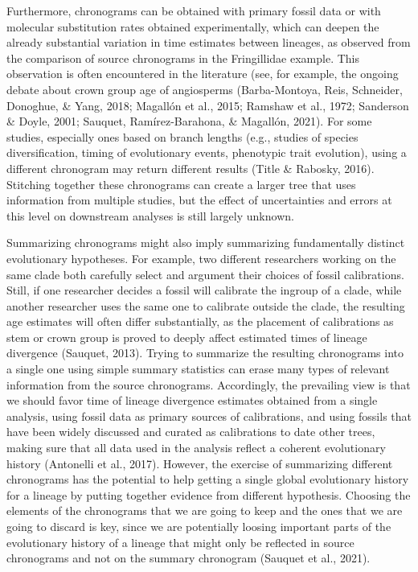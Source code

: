 \documentclass[
  english,
  man]{apa6}
\begin{document}
Furthermore, chronograms can be obtained with primary fossil data or with molecular substitution rates obtained experimentally, which can deepen the already substantial variation in time estimates between lineages, as observed from the comparison of source chronograms in the Fringillidae example.
This observation is often encountered in the literature
(see, for example, the ongoing debate about crown group age of angiosperms (Barba-Montoya, Reis, Schneider, Donoghue, \& Yang, 2018; Magallón et al., 2015; Ramshaw et al., 1972; Sanderson \& Doyle, 2001; Sauquet, Ramírez-Barahona, \& Magallón, 2021). For some studies, especially ones based on branch lengths (e.g., studies of species diversification, timing of evolutionary events, phenotypic trait evolution), using a different chronogram may return different results (Title \& Rabosky, 2016). Stitching together these chronograms can create a larger tree that uses information from multiple studies, but the effect of uncertainties and errors at this level on downstream analyses is still largely unknown.

Summarizing chronograms might also imply summarizing fundamentally distinct evolutionary hypotheses.
For example, two different researchers working on the same clade both carefully select and argument their choices of fossil calibrations.
Still, if one researcher decides a fossil will calibrate the ingroup of a clade, while another researcher uses the same one to calibrate outside the clade, the resulting age estimates will often differ substantially, as the placement of calibrations as stem or crown group is proved to deeply affect estimated times of lineage divergence (Sauquet, 2013). Trying to summarize the resulting chronograms into a single one using simple summary statistics can erase many types of relevant information from the source chronograms. Accordingly, the prevailing view is that we should favor time of lineage divergence estimates obtained from a single analysis, using fossil data as primary sources of calibrations, and using fossils that have been widely discussed and curated as calibrations to date other trees, making sure that all data used in the analysis reflect a coherent evolutionary history (Antonelli et al., 2017).
However, the exercise of summarizing different chronograms has the potential to help getting a single global evolutionary history for a lineage by putting together evidence from different hypothesis. Choosing the elements of the chronograms that we are going to keep and the ones that we are going to discard is key, since we are potentially loosing important parts of the evolutionary history of a lineage that might only be reflected in source chronograms and not on the summary chronogram (Sauquet et al., 2021).
\end{document}
